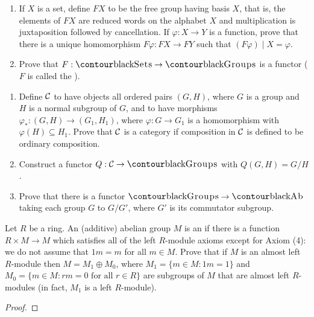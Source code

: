     \begin{exercise}
        \phantom{a}
        \begin{enumerate}[label = (\roman*)]
            \item If $X$ is a set, define $FX$ to be the free group having basis $X$, that is, the elements of $FX$ are reduced words on the alphabet $X$ and multiplication is juxtaposition followed by cancellation. If $\varphi:X \rightarrow Y$ is a function, prove that there is a unique homomorphism $F\varphi:FX \rightarrow FY$ such that $(F\varphi)\mid X = \varphi$.
            \item Prove that $F:\cSets \rightarrow \cGroups$ is a functor ($F$ is called the ).
        \end{enumerate}
    \end{exercise}

    \begin{exercise}
        \phantom{a}
        \begin{enumerate}[label = (\roman*)]
            \item Define $\mathcal{C}$ to have objects all ordered pairs $(G,H)$, where $G$ is a group and $H$ is a normal subgroup of $G$, and to have morphisms $\varphi_*:(G,H) \rightarrow (G_1,H_1)$, where $\varphi:G \rightarrow G_1$ is a homomorphism with $\varphi(H) \subseteq H_1$. Prove that $\mathcal{C}$ is a category if composition in $\mathcal{C}$ is defined to be ordinary composition.
            \item Construct a functor $Q: \mC \rightarrow \cGroups$ with $Q(G,H) = G/H$.
            \item Prove that there is a functor $\cGroups \rightarrow \cAb$ taking each group $G$ to $G/G'$, where $G'$ is its commutator subgroup.
        \end{enumerate}
    \end{exercise}

    \begin{exercise}
        Let $R$ be a ring. An (additive) abelian group $M$ is an  if there is a function $R \times M \rightarrow M$ which satisfies all of the left $R$-module axioms except for Axiom (4): we do not assume that $1m = m$ for all $m \in M$. Prove that if $M$ is an almost left $R$-module then $M = M_1 \oplus M_0$, where $M_1 = \{m \in M:1m = 1\}$ and $M_0 = \{m \in M: rm = 0 \hspace{4pt} \text{for all $r \in R$}\}$ are subgroups of $M$ that are almost left $R$-modules (in fact, $M_1$ is a left $R$-module).
    \end{exercise}
        {\color{red}\begin{proof}   
            
        \end{proof}}

